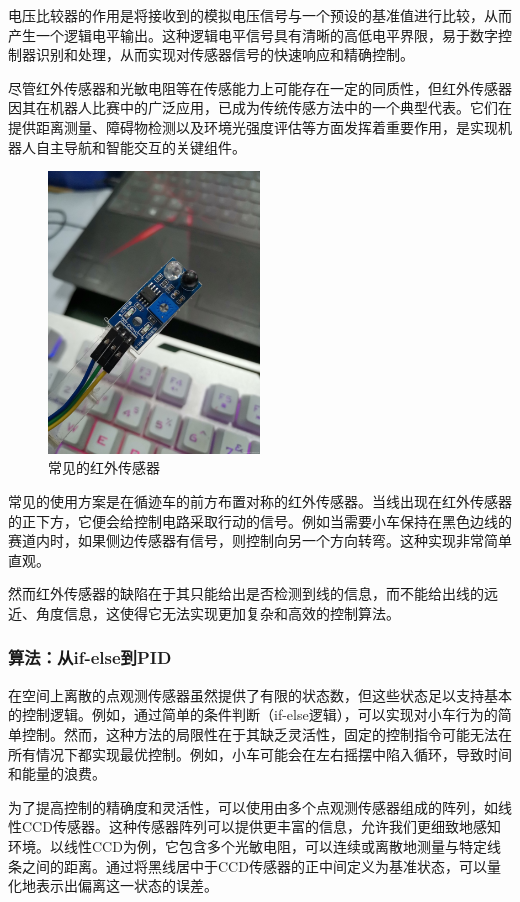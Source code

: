 \documentclass{report}
\begin{document}
电压比较器的作用是将接收到的模拟电压信号与一个预设的基准值进行比较，从而产生一个逻辑电平输出。这种逻辑电平信号具有清晰的高低电平界限，易于数字控制器识别和处理，从而实现对传感器信号的快速响应和精确控制。

尽管红外传感器和光敏电阻等在传感能力上可能存在一定的同质性，但红外传感器因其在机器人比赛中的广泛应用，已成为传统传感方法中的一个典型代表。它们在提供距离测量、障碍物检测以及环境光强度评估等方面发挥着重要作用，是实现机器人自主导航和智能交互的关键组件。
\begin{figure}[ht]
  \centering
  \includegraphics[width=0.5\textwidth]{figures/sensor.jpg}
  \caption{ 常见的红外传感器}
\end{figure}

常见的使用方案是在循迹车的前方布置对称的红外传感器。当线出现在红外传感器的正下方，它便会给控制电路采取行动的信号。例如当需要小车保持在黑色边线的赛道内时，如果侧边传感器有信号，则控制向另一个方向转弯。这种实现非常简单直观。

然而红外传感器的缺陷在于其只能给出是否检测到线的信息，而不能给出线的远近、角度信息，这使得它无法实现更加复杂和高效的控制算法。

\subsubsection{算法：从if-else到PID}
\label{subsec:label}
在空间上离散的点观测传感器虽然提供了有限的状态数，但这些状态足以支持基本的控制逻辑。例如，通过简单的条件判断（if-else逻辑），可以实现对小车行为的简单控制。然而，这种方法的局限性在于其缺乏灵活性，固定的控制指令可能无法在所有情况下都实现最优控制。例如，小车可能会在左右摇摆中陷入循环，导致时间和能量的浪费。

为了提高控制的精确度和灵活性，可以使用由多个点观测传感器组成的阵列，如线性CCD传感器。这种传感器阵列可以提供更丰富的信息，允许我们更细致地感知环境。以线性CCD为例，它包含多个光敏电阻，可以连续或离散地测量与特定线条之间的距离。通过将黑线居中于CCD传感器的正中间定义为基准状态，可以量化地表示出偏离这一状态的误差\cite{CCD}。
\end{document}
